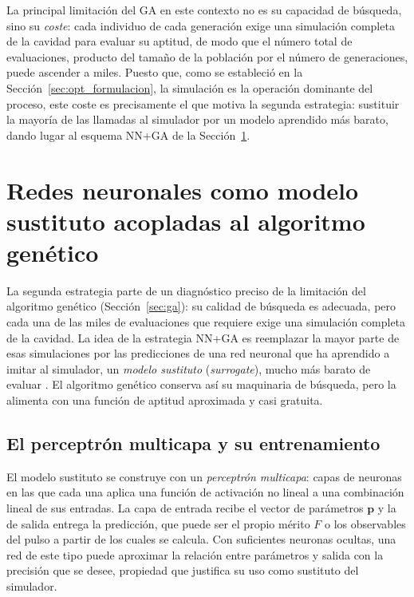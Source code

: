 La principal limitación del GA en este contexto no es su capacidad de búsqueda, sino
su \emph{coste}: cada individuo de cada generación exige una simulación completa de
la cavidad para evaluar su aptitud, de modo que el número total de evaluaciones, producto del tamaño de la población por el número de generaciones, puede ascender
a miles. Puesto que, como se estableció en la Sección~\ref{sec:opt_formulacion}, la
simulación es la operación dominante del proceso, este coste es precisamente el que
motiva la segunda estrategia: sustituir la mayoría de las llamadas al simulador por
un modelo aprendido más barato, dando lugar al esquema NN+GA de la
Sección~\ref{sec:nnga}.



\section{Redes neuronales como modelo sustituto acopladas al algoritmo genético}
\label{sec:nnga}

La segunda estrategia parte de un diagnóstico preciso de la limitación del
algoritmo genético (Sección~\ref{sec:ga}): su calidad de búsqueda es adecuada, pero
cada una de las miles de evaluaciones que requiere exige una simulación completa de
la cavidad. La idea de la estrategia NN+GA es reemplazar la mayor parte de esas
simulaciones por las predicciones de una red neuronal que ha aprendido a imitar al
simulador, un \emph{modelo sustituto} (\emph{surrogate}), mucho más barato de
evaluar \cite{Baumeister2018,Genty2021}. El algoritmo genético conserva así su
maquinaria de búsqueda, pero la alimenta con una función de aptitud aproximada y
casi gratuita.

\subsection{El perceptrón multicapa y su entrenamiento}
\label{sec:mlp}\label{sec:entrenamiento}

El modelo sustituto se construye con un \emph{perceptrón multicapa}: capas de neuronas
en las que cada una aplica una función de activación no lineal a una combinación
lineal de sus entradas. La capa de entrada recibe el vector de parámetros
$\mathbf{p}$ y la de salida entrega la predicción, que puede ser el propio mérito $F$ o
los observables del pulso a partir de los cuales se calcula. Con suficientes neuronas
ocultas, una red de este tipo puede aproximar la relación entre parámetros y salida
con la precisión que se desee, propiedad que justifica su uso como sustituto del
simulador.

